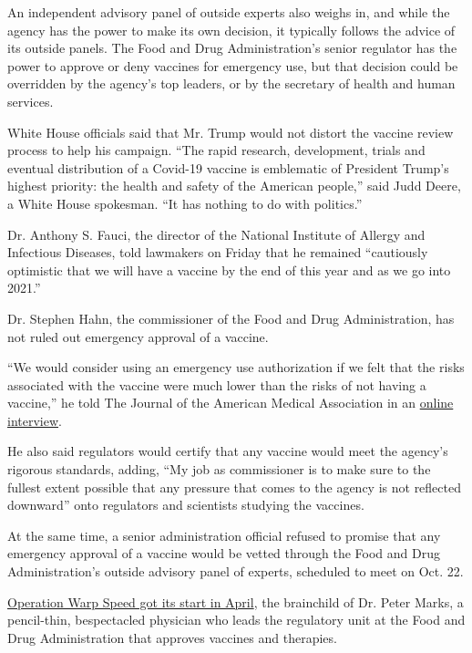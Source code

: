 An independent advisory panel of outside experts also weighs in, and
while the agency has the power to make its own decision, it typically
follows the advice of its outside panels. The Food and Drug
Administration's senior regulator has the power to approve or deny
vaccines for emergency use, but that decision could be overridden by the
agency's top leaders, or by the secretary of health and human services.

White House officials said that Mr. Trump would not distort the vaccine
review process to help his campaign. ``The rapid research, development,
trials and eventual distribution of a Covid-19 vaccine is emblematic of
President Trump's highest priority: the health and safety of the
American people,'' said Judd Deere, a White House spokesman. ``It has
nothing to do with politics.''

Dr. Anthony S. Fauci, the director of the National Institute of Allergy
and Infectious Diseases, told lawmakers on Friday that he remained
``cautiously optimistic that we will have a vaccine by the end of this
year and as we go into 2021.''

Dr. Stephen Hahn, the commissioner of the Food and Drug Administration,
has not ruled out emergency approval of a vaccine.

``We would consider using an emergency use authorization if we felt that
the risks associated with the vaccine were much lower than the risks of
not having a vaccine,'' he told The Journal of the American Medical
Association in an
\href{https://www.youtube.com/watch?v=UdmaU2-C_wE\&feature=youtu.be}{online
interview}.

He also said regulators would certify that any vaccine would meet the
agency's rigorous standards, adding, ``My job as commissioner is to make
sure to the fullest extent possible that any pressure that comes to the
agency is not reflected downward'' onto regulators and scientists
studying the vaccines.

At the same time, a senior administration official refused to promise
that any emergency approval of a vaccine would be vetted through the
Food and Drug Administration's outside advisory panel of experts,
scheduled to meet on Oct. 22.

\href{https://www.nytimes.com/2020/04/29/us/politics/trump-coronavirus-vaccine-operation-warp-speed.html}{Operation
Warp Speed got its start in April}, the brainchild of Dr. Peter Marks, a
pencil-thin, bespectacled physician who leads the regulatory unit at the
Food and Drug Administration that approves vaccines and therapies.

